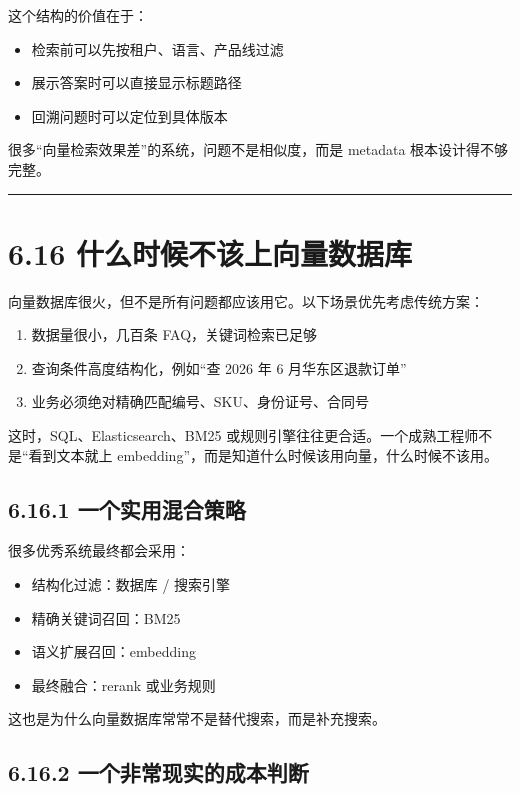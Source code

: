 这个结构的价值在于：


\begin{itemize}[leftmargin=2em]
\item 检索前可以先按租户、语言、产品线过滤
\item 展示答案时可以直接显示标题路径
\item 回溯问题时可以定位到具体版本
\end{itemize}

很多``向量检索效果差''的系统，问题不是相似度，而是 metadata 根本设计得不够完整。


\bigskip\hrule\bigskip

\section{6.16 什么时候不该上向量数据库}

向量数据库很火，但不是所有问题都应该用它。以下场景优先考虑传统方案：


\begin{enumerate}[leftmargin=2em]
\item 数据量很小，几百条 FAQ，关键词检索已足够
\item 查询条件高度结构化，例如``查 2026 年 6 月华东区退款订单''
\item 业务必须绝对精确匹配编号、SKU、身份证号、合同号
\end{enumerate}

这时，SQL、Elasticsearch、BM25 或规则引擎往往更合适。一个成熟工程师不是``看到文本就上 embedding''，而是知道什么时候该用向量，什么时候不该用。


\subsection{6.16.1 一个实用混合策略}

很多优秀系统最终都会采用：


\begin{itemize}[leftmargin=2em]
\item 结构化过滤：数据库 / 搜索引擎
\item 精确关键词召回：BM25
\item 语义扩展召回：embedding
\item 最终融合：rerank 或业务规则
\end{itemize}

这也是为什么向量数据库常常不是替代搜索，而是补充搜索。


\subsection{6.16.2 一个非常现实的成本判断}

